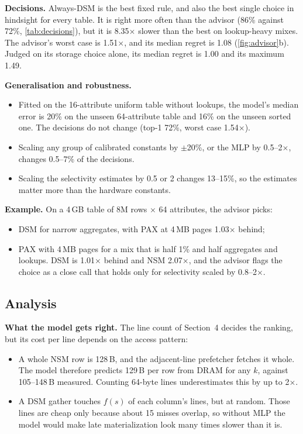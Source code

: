 \begin{table}[t]
\caption{Decisions on 1000 random workloads: the advisor against fixed rules (which are given
the best measured options).}
\label{tab:decisions}
\small{}
\end{table}

\textbf{Decisions.} Always-DSM is the best fixed rule, and also the best single choice in
hindsight for every table. It is right more often than the advisor (86\% against 72\%,
\cref{tab:decisions}), but it is 8.35$\times$ slower than the best on lookup-heavy mixes. The
advisor's worst case is 1.51$\times$, and its median regret is 1.08 (\cref{fig:advisor}b). Judged
on its storage choice alone, its median regret is 1.00 and its maximum 1.49.

\textbf{Generalisation and robustness.}
\begin{itemize}
  \item Fitted on the 16-attribute uniform table without lookups, the model's median error is
  20\% on the unseen 64-attribute table and 16\% on the unseen sorted one. The decisions do
  not change (top-1 72\%, worst case 1.54$\times$).
  \item Scaling any group of calibrated constants by $\pm$20\%, or the MLP by 0.5--2$\times$,
  changes 0.5--7\% of the decisions.
  \item Scaling the selectivity estimates by 0.5 or 2 changes 13--15\%, so the estimates
  matter more than the hardware constants.
\end{itemize}

\textbf{Example.} On a 4\,GB table of 8M rows $\times$ 64 attributes, the advisor picks:
\begin{itemize}
  \item DSM for narrow aggregates, with PAX at 4\,MB pages 1.03$\times$ behind;
  \item PAX with 4\,MB pages for a mix that is half 1\%  and half aggregates
  and lookups. DSM is 1.01$\times$ behind and NSM 2.07$\times$, and the advisor flags the
  choice as a close call that holds only for selectivity scaled by 0.8--2$\times$.
\end{itemize}

\subsection{Analysis}
\textbf{What the model gets right.} The line count of Section~4 decides the ranking, but its
cost per line depends on the access pattern:
\begin{itemize}
  \item A whole NSM row is 128\,B, and the adjacent-line prefetcher fetches it whole. The model
  therefore predicts 129\,B per row from DRAM for any $k$, against 105--148\,B measured.
  Counting 64-byte lines underestimates this by up to 2$\times$.
  \item A DSM gather touches $f(s)$ of each column's lines, but at random. Those lines are
  cheap only because about 15 misses overlap, so without MLP the model would make late
  materialization look many times slower than it is.
\end{itemize}

